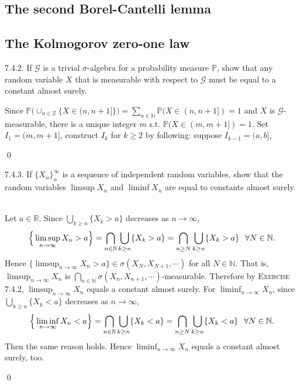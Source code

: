 \subsection{The second Borel-Cantelli lemma}

\subsection{The Kolmogorov zero-one law}
\begin{exercise}7.4.2.
If $\mathcal{G}$ is a trivial $\sigma$-algebra for a probability measure $\mathbb{P}$, show that any random variable $X$ that is measurable with respect to $\mathcal{G}$ must be equal to a constant almost surely.
\end{exercise} 
\begin{answer}Since $\mathbb{P}\big(\cup_{n\in\mathbb{Z}}\{X\in(n,n+1]\}\big)=\sum_{n\in\mathbb{N}}\mathbb{P}(X\in(n,n+1])=1$ and $X$ is $\mathcal{G}$-measurable, there is a unique integer $m$ s.t. $\mathbb{P}(X\in(m,m+1])=1$. Set $I_1=(m,m+1]$, construct $I_k$ for $k\geq 2$ by following: suppose $I_{k-1}=(a,b]$,  

\end{answer}\qed \qquad
\begin{exercise}7.4.3.
 If $\{ X_n\}_n^\infty$ is a sequence of independent random variables, show that the random variables $\limsup X_n$ and $\liminf X_n$ are equal to constants almost surely.
\end{exercise}
\begin{answer} \\
Let $a\in\mathbb{R}$. Since $\bigcup_{k\geq n}\{X_k>a\}$ decreases as $n\rightarrow\infty$,
\begin{equation*}
    \begin{aligned}
        \Big\{\limsup_{n\rightarrow\infty}X_n>a\Big\}=\bigcap_{n\in\mathbb{N}}\bigcup_{k\geq n}\{X_k>a\}=\bigcap_{n\geq N}\bigcup_{k\geq n}\{X_k>a\}\hspace{0.25cm}\forall N\in\mathbb{N}.
    \end{aligned}
\end{equation*}
Hence $\{\limsup_{n\rightarrow\infty}X_n>a\}\in\sigma(X_N,X_{N+1},\cdots)$ for all $N\in\mathbb{N}$. That is, $\limsup_{n\rightarrow\infty}X_n$ is $\bigcap_{n\in\mathbb{N}}\sigma(X_n,X_{n+1},\cdots)$-measurable. Therefore by \textsc{Exercise 7.4.2}, $\limsup_{n\rightarrow\infty}X_n$ equals a constant almost surely. For $\liminf_{n\rightarrow\infty}X_n$, since $\bigcup_{k\geq n}\{X_k<a\}$ decreases as $n\rightarrow\infty$,
\begin{equation*}
    \Big\{\liminf_{n\rightarrow\infty}X_n<a\Big\}=\bigcap_{n\in\mathbb{N}}\bigcup_{k\geq n}\{X_k<a\}=\bigcap_{n\geq N}\bigcup_{k\geq n}\{X_k<a\}\hspace{0.25cm}\forall N\in\mathbb{N}.
\end{equation*}
Then the same reason holds. Hence $\liminf_{n\rightarrow\infty}X_n$ equals a constant almost surely, too.
\end{answer}\qed\qquad


